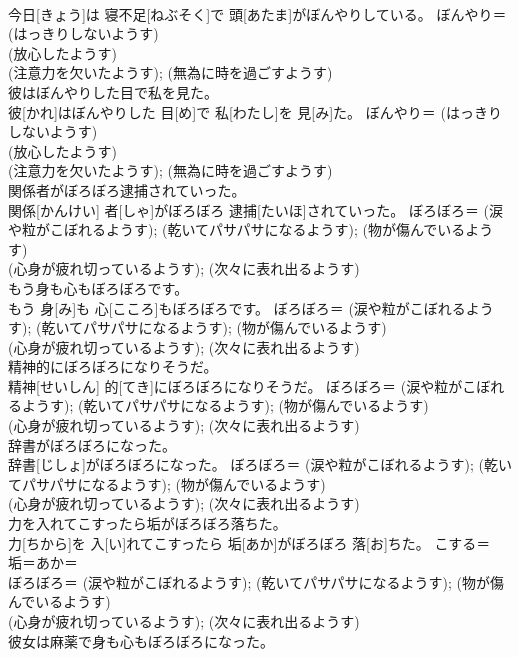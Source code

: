 \documentclass[8pt]{extreport}
\begin{document}
\begin{CJK}{UTF8}{min}
{\\	今日[きょう]は 寝不足[ねぶそく]で 頭[あたま]がぼんやりしている。	ぼんやり＝ (はっきりしないようす) 
\\	(放心したようす) 
\\	(注意力を欠いたようす); (無為に時を過ごすようす) 
\\	彼はぼんやりした目で私を見た。	
\\	彼[かれ]はぼんやりした 目[め]で 私[わたし]を 見[み]た。	ぼんやり＝ (はっきりしないようす) 
\\	(放心したようす) 
\\	(注意力を欠いたようす); (無為に時を過ごすようす) 
\\	関係者がぼろぼろ逮捕されていった。	
\\	関係[かんけい] 者[しゃ]がぼろぼろ 逮捕[たいほ]されていった。	ぼろぼろ＝ (涙や粒がこぼれるようす); (乾いてパサパサになるようす); (物が傷んでいるようす) 
\\	(心身が疲れ切っているようす); (次々に表れ出るようす)
\\	もう身も心もぼろぼろです。	
\\	もう 身[み]も 心[こころ]もぼろぼろです。	ぼろぼろ＝ (涙や粒がこぼれるようす); (乾いてパサパサになるようす); (物が傷んでいるようす) 
\\	(心身が疲れ切っているようす); (次々に表れ出るようす)
\\	精神的にぼろぼろになりそうだ。	
\\	精神[せいしん] 的[てき]にぼろぼろになりそうだ。	ぼろぼろ＝ (涙や粒がこぼれるようす); (乾いてパサパサになるようす); (物が傷んでいるようす) 
\\	(心身が疲れ切っているようす); (次々に表れ出るようす)
\\	辞書がぼろぼろになった。	
\\	辞書[じしょ]がぼろぼろになった。	ぼろぼろ＝ (涙や粒がこぼれるようす); (乾いてパサパサになるようす); (物が傷んでいるようす) 
\\	(心身が疲れ切っているようす); (次々に表れ出るようす)
\\	力を入れてこすったら垢がぼろぼろ落ちた。	
\\	力[ちから]を 入[い]れてこすったら 垢[あか]がぼろぼろ 落[お]ちた。	こする＝ 
\\	垢＝あか＝ 
\\	ぼろぼろ＝ (涙や粒がこぼれるようす); (乾いてパサパサになるようす); (物が傷んでいるようす) 
\\	(心身が疲れ切っているようす); (次々に表れ出るようす)
\\	彼女は麻薬で身も心もぼろぼろになった。	
}
\end{CJK}
\end{document}
